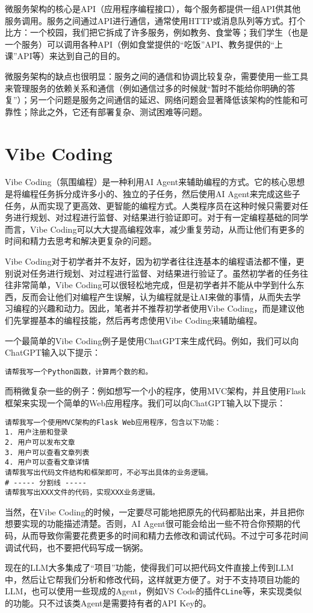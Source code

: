 \documentclass[../main.tex]{subfiles}
\begin{document}
微服务架构的核心是API（应用程序编程接口），每个服务都提供一组API供其他服务调用。服务之间通过API进行通信，通常使用HTTP或消息队列等方式。打个比方：一个校园，我们把它拆成了许多服务，例如教务、食堂等；我们学生（也是一个服务）可以调用各种API（例如食堂提供的“吃饭”API、教务提供的“上课”API等）来达到自己的目的。

微服务架构的缺点也很明显：服务之间的通信和协调比较复杂，需要使用一些工具来管理服务的依赖关系和通信（例如通信过多的时候就“暂时不能给你明确的答复”）；另一个问题是服务之间通信的延迟、网络问题会显著降低该架构的性能和可靠性；除此之外，它还有部署复杂、测试困难等问题。

\section{Vibe Coding}

Vibe Coding（氛围编程）是一种利用AI Agent来辅助编程的方式。它的核心思想是将编程任务拆分成许多小的、独立的子任务，然后使用AI Agent来完成这些子任务，从而实现了更高效、更智能的编程方式。人类程序员在这种时候只需要对任务进行规划、对过程进行监督、对结果进行验证即可。对于有一定编程基础的同学而言，Vibe Coding可以大大提高编程效率，减少重复劳动，从而让他们有更多的时间和精力去思考和解决更复杂的问题。

\begin{caution}
  Vibe Coding对于初学者并不友好，因为初学者往往连基本的编程语法都不懂，更别说对任务进行规划、对过程进行监督、对结果进行验证了。虽然初学者的任务往往非常简单，Vibe Coding可以很轻松地完成，但是初学者并不能从中学到什么东西，反而会让他们对编程产生误解，认为编程就是让AI来做的事情，从而失去学习编程的兴趣和动力。因此，笔者并不推荐初学者使用Vibe Coding，而是建议他们先掌握基本的编程技能，然后再考虑使用Vibe Coding来辅助编程。
\end{caution}

一个最简单的Vibe Coding例子是使用ChatGPT来生成代码。例如，我们可以向ChatGPT输入以下提示：
\begin{lstlisting}
请帮我写一个Python函数，计算两个数的和。
\end{lstlisting}

而稍微复杂一些的例子：例如想写一个小的程序，使用MVC架构，并且使用Flask框架来实现一个简单的Web应用程序。我们可以向ChatGPT输入以下提示：
\begin{lstlisting}
请帮我写一个使用MVC架构的Flask Web应用程序，包含以下功能：
1. 用户注册和登录
2. 用户可以发布文章
3. 用户可以查看文章列表
4. 用户可以查看文章详情
请帮我写出代码文件结构和框架即可，不必写出具体的业务逻辑。
# ----- 分割线 -----
请帮我写出XXX文件的代码，实现XXX业务逻辑。
\end{lstlisting}
当然，在Vibe Coding的时候，一定要尽可能地把原先的代码都贴出来，并且把你想要实现的功能描述清楚。否则，AI Agent很可能会给出一些不符合你预期的代码，从而导致你需要花费更多的时间和精力去修改和调试代码。不过宁可多花时间调试代码，也不要把代码写成一锅粥。

现在的LLM大多集成了“项目”功能，使得我们可以把代码文件直接上传到LLM中，然后让它帮我们分析和修改代码，这样就更方便了。对于不支持项目功能的LLM，也可以使用一些现成的Agent，例如VS Code的插件\texttt{CLine}等，来实现类似的功能。只不过该类Agent是需要持有者的API Key的。
\end{document}

